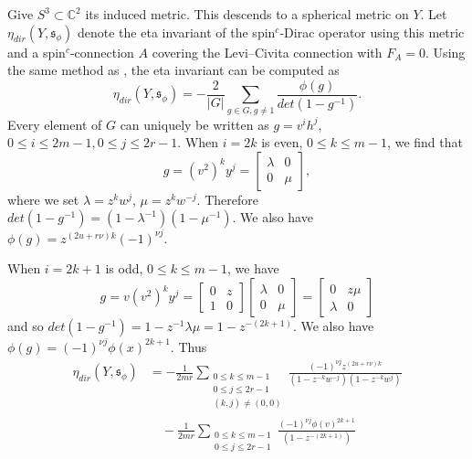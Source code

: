 \documentclass{amsart}
\theoremstyle{definition}
\theoremstyle{remark}
\numberwithin{equation}{section}
\begin{document}
Give $S^3 \subset \mathbb{C}^2$ its induced metric. This descends to a spherical metric on $Y$. Let $\eta_{dir}(Y , \mathfrak{s}_\phi)$ denote the eta invariant of the spin$^c$-Dirac operator using this metric and a spin$^c$-connection $A$ covering the Levi--Civita connection with $F_A = 0$. Using the same method as \cite[]{bar}, the eta invariant can be computed as
\[
\eta_{dir}(Y , \mathfrak{s}_\phi) = -\frac{2}{|G|} \sum_{g \in G, g \neq 1} \frac{\phi(g)}{det(1-g^{-1})}.
\]
Every element of $G$ can uniquely be written as $g = v^i h^j$, $0 \le i \le 2m-1, 0\le j \le 2r-1$. When $i = 2k$ is even, $0 \le k \le m-1$, we find that
\[
g = (v^2)^{k} y^j = \left[ \begin{matrix} \lambda & 0 \\ 0 & \mu \end{matrix} \right],
\]
where we set $\lambda = z^k w^j$, $\mu = z^k w^{-j}$. Therefore $det(1-g^{-1}) = (1 - \lambda^{-1})(1- \mu^{-1})$. We also have $\phi(g) = z^{(2u+r\nu)k} (-1)^{\nu j}$.

When $i = 2k+1$ is odd, $0 \le k  \le m-1$, we have 
\[
g = v (v^2)^k y^j = \left[ \begin{matrix} 0 & z \\ 1 & 0 \end{matrix} \right] \left[ \begin{matrix} \lambda & 0 \\ 0 & \mu \end{matrix} \right] = \left[ \begin{matrix} 0 & z\mu \\ \lambda & 0 \end{matrix} \right]
\]
and so $det(1-g^{-1}) = 1 - z^{-1}\lambda \mu = 1 - z^{-(2k+1)}$. We also have $\phi(g) = (-1)^{\nu j } \phi(x)^{2k+1}$. Thus
\begin{align*}
\eta_{dir}(Y , \mathfrak{s}_\phi) &= -\frac{1}{2mr} \sum_{\substack{0 \le k \le m-1 \\ 0 \le j \le 2r-1 \\ (k,j) \neq (0,0)} } \frac{ (-1)^{\nu j} z^{(2u + r\nu)k} }{(1-z^{-k}w^{-j})(1-z^{-k}w^j)} \\
& \quad - \frac{1}{2mr} \sum_{\substack{0 \le k \le m-1 \\ 0 \le j \le 2r-1}} \frac{ (-1)^{\nu j} \phi(v)^{2k+1} }{(1-z^{-(2k+1)})}
\end{align*}
\end{document}
